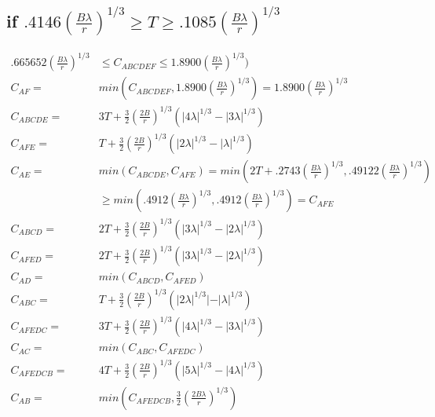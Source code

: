 \documentclass[12pt]{article}
\theoremstyle{plain}
\theoremstyle{remark}
\theoremstyle{definition}
\renewcommand{\geq}{\geqslant}
\renewcommand{\leq}{\leqslant}
\renewcommand{\geq}{\geqslant}
\renewcommand{\leq}{\leqslant}
\begin{document}
\subsection{if $.4146 (\frac{B\lambda}{r})^{1/3} \geq T \geq .1085 (\frac{B\lambda}{r})^{1/3} $}
\begin{align}
  .665652 (\frac{B\lambda}{r})^{1/3} & \leq C_{ABCDEF} \leq  1.8900 (\frac{B\lambda}{r})^{1/3})\\
  C_{AF} =& min(C_{ABCDEF}, 1.8900(\frac{B\lambda}{r})^{1/3})=1.8900(\frac{B\lambda}{r})^{1/3}\\
  C_{ABCDE} = &3T+ \frac{3}{2}(\frac{2B}{r})^{1/3}(|4\lambda|^{1/3}-|3\lambda|^{1/3})\\
  C_{AFE} = &T+ \frac{3}{2}(\frac{2B}{r})^{1/3}(|2\lambda|^{1/3}-|\lambda|^{1/3})\\
  C_{AE} =& min(C_{ABCDE},C_{AFE})=min(2T+ .2743(\frac{B\lambda}{r})^{1/3}, .49122(\frac{B\lambda}{r})^{1/3})\\
  & \geq min(.4912(\frac{B\lambda}{r})^{1/3}, .4912(\frac{B\lambda}{r})^{1/3})=C_{AFE}\\
  C_{ABCD} = &2T+ \frac{3}{2}(\frac{2B}{r})^{1/3}(|3\lambda|^{1/3}-|2\lambda|^{1/3})\\
  C_{AFED} = &2T+ \frac{3}{2}(\frac{2B}{r})^{1/3}(|3\lambda|^{1/3}-|2\lambda|^{1/3})\\
  C_{AD} =& min(C_{ABCD},C_{AFED})\\
  C_{ABC} = &T+ \frac{3}{2}(\frac{2B}{r})^{1/3}(|2\lambda|^{1/3}|-|\lambda|^{1/3})\\
  C_{AFEDC} = &3T+ \frac{3}{2}(\frac{2B}{r})^{1/3}(|4\lambda|^{1/3}-|3\lambda|^{1/3})\\
  C_{AC} =& min(C_{ABC},C_{AFEDC})\\
  C_{AFEDCB} =& 4T+\frac{3}{2}(\frac{2B}{r})^{1/3}(|5\lambda|^{1/3}-|4\lambda|^{1/3})\\
  C_{AB} =& min(C_{AFEDCB}, \frac{3}{2}(\frac{2B\lambda}{r})^{1/3})
\end{align}
\end{document}
